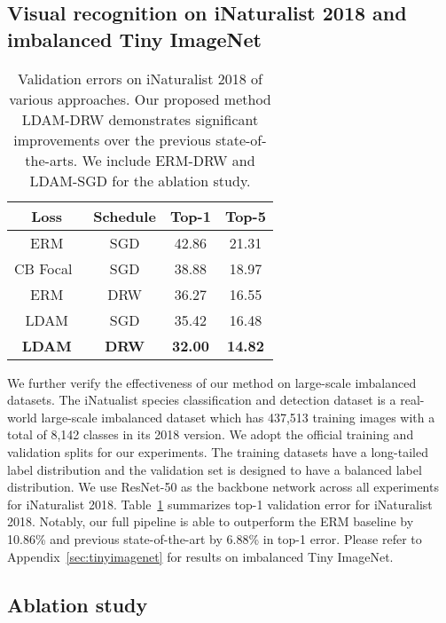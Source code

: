 \documentclass{article}
\newcommand{\ldam}{\textup{LDAM}}
\newcommand{\BMCE}{{\ldam}}
\newcommand{\tstagew}{DRW}
\begin{document}
\subsection{Visual recognition on iNaturalist 2018 and imbalanced Tiny ImageNet}

\begin{table}[]
	\caption{Validation errors on iNaturalist 2018 of various approaches. Our proposed method \ldam{}-\tstagew{} demonstrates significant improvements over the previous state-of-the-arts. We include ERM-\tstagew{} and \BMCE{}-SGD for the ablation study.}
	\label{tab:inat-table}
	\centering
	\begin{tabular}{cc|cc}
		\toprule
		Loss       & Schedule & Top-1 & Top-5 \\
		\midrule
ERM & SGD        & 42.86 & 21.31 \\
		CB Focal~\citep{cui2019classbalancedloss} & SGD       & 38.88 & 18.97 \\
ERM & \tstagew{} & 36.27 & 16.55 \\
		\BMCE{} & SGD & 35.42 & 16.48 \\
	    \textbf{\BMCE{}} & \textbf{\tstagew{}} & \textbf{32.00} & \textbf{14.82} \\
		\bottomrule
	\end{tabular}
\end{table}

We further verify the effectiveness of our method on large-scale imbalanced datasets. The iNatualist species classification and detection dataset \citep{van2018inaturalist} is a real-world large-scale imbalanced dataset which has 437,513 training images with a total of 8,142 classes in its 2018 version. We adopt the official training and validation splits for our experiments. The training datasets have a long-tailed label distribution and the validation set is designed to have a balanced label distribution. We use ResNet-50 as the backbone network across all experiments for iNaturalist 2018. Table~\ref{tab:inat-table} summarizes top-1 validation error for iNaturalist 2018. Notably, our full pipeline is able to outperform the ERM baseline by 10.86\% and previous state-of-the-art by 6.88\% in top-1 error. Please refer to Appendix~\ref{sec:tinyimagenet} for results on imbalanced Tiny ImageNet.

\subsection{Ablation study} \label{sec:ablation}
\end{document}
